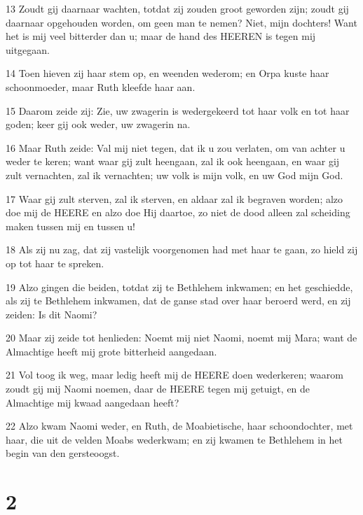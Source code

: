 \par 13 Zoudt gij daarnaar wachten, totdat zij zouden groot geworden zijn; zoudt gij daarnaar opgehouden worden, om geen man te nemen? Niet, mijn dochters! Want het is mij veel bitterder dan u; maar de hand des HEEREN is tegen mij uitgegaan.
\par 14 Toen hieven zij haar stem op, en weenden wederom; en Orpa kuste haar schoonmoeder, maar Ruth kleefde haar aan.
\par 15 Daarom zeide zij: Zie, uw zwagerin is wedergekeerd tot haar volk en tot haar goden; keer gij ook weder, uw zwagerin na.
\par 16 Maar Ruth zeide: Val mij niet tegen, dat ik u zou verlaten, om van achter u weder te keren; want waar gij zult heengaan, zal ik ook heengaan, en waar gij zult vernachten, zal ik vernachten; uw volk is mijn volk, en uw God mijn God.
\par 17 Waar gij zult sterven, zal ik sterven, en aldaar zal ik begraven worden; alzo doe mij de HEERE en alzo doe Hij daartoe, zo niet de dood alleen zal scheiding maken tussen mij en tussen u!
\par 18 Als zij nu zag, dat zij vastelijk voorgenomen had met haar te gaan, zo hield zij op tot haar te spreken.
\par 19 Alzo gingen die beiden, totdat zij te Bethlehem inkwamen; en het geschiedde, als zij te Bethlehem inkwamen, dat de ganse stad over haar beroerd werd, en zij zeiden: Is dit Naomi?
\par 20 Maar zij zeide tot henlieden: Noemt mij niet Naomi, noemt mij Mara; want de Almachtige heeft mij grote bitterheid aangedaan.
\par 21 Vol toog ik weg, maar ledig heeft mij de HEERE doen wederkeren; waarom zoudt gij mij Naomi noemen, daar de HEERE tegen mij getuigt, en de Almachtige mij kwaad aangedaan heeft?
\par 22 Alzo kwam Naomi weder, en Ruth, de Moabietische, haar schoondochter, met haar, die uit de velden Moabs wederkwam; en zij kwamen te Bethlehem in het begin van den gersteoogst.

\chapter{2}

